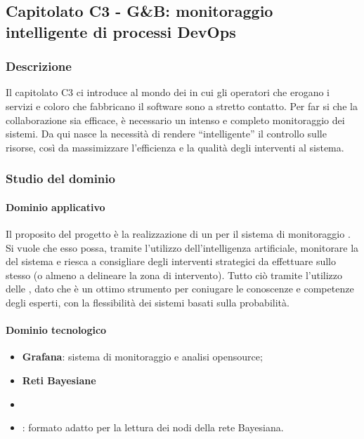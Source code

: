 	\subsection{Capitolato C3 - G\&B: monitoraggio intelligente di processi DevOps}
	
		\subsubsection{Descrizione}
		Il capitolato C3 ci introduce al mondo dei  in cui gli operatori che erogano i servizi e coloro che fabbricano il software sono a stretto contatto. Per far si che la collaborazione sia efficace, è necessario un intenso e completo monitoraggio dei sistemi. Da qui nasce la necessità di rendere “intelligente” il controllo sulle risorse, così da massimizzare l’efficienza e la qualità degli interventi al sistema.

	\subsubsection{Studio del dominio}
		\paragraph{Dominio applicativo} \Spazio 
		Il proposito del progetto è la realizzazione di un  per il sistema di monitoraggio . Si vuole che esso possa, tramite l’utilizzo dell’intelligenza artificiale, monitorare la  del sistema e riesca a consigliare degli interventi strategici da effettuare sullo stesso (o almeno a delineare la zona di intervento). Tutto ciò tramite l’utilizzo delle , dato che è un ottimo strumento per coniugare le conoscenze e competenze degli esperti, con la flessibilità dei sistemi basati sulla probabilità.
		\paragraph{Dominio tecnologico}
		\begin{itemize}
		\item\textbf{{Grafana}}: sistema di monitoraggio e analisi opensource;
		\item\textbf{{Reti Bayesiane}} 
		\item\textbf{{}}
		\item\textbf{{}}: formato adatto per la lettura dei nodi della rete Bayesiana.
		\end{itemize}
	
